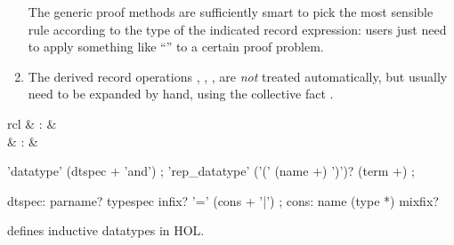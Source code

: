 \begin{isabellebody}
\begin{isamarkuptext}
\begin{enumerate}
  The generic proof methods are sufficiently smart to pick the most
  sensible rule according to the type of the indicated record
  expression: users just need to apply something like ``'' to a certain proof problem.

  \item The derived record operations , , ,  are \emph{not}
  treated automatically, but usually need to be expanded by hand,
  using the collective fact .

  \end{enumerate}%
\end{isamarkuptext}%
\isamarkuptrue%
%
\isamarkuptrue%
%
\begin{isamarkuptext}%
\begin{matharray}{rcl}
    \hypertarget{command.HOL.datatype}{\hyperlink{command.HOL.datatype}{\mbox{}}} & : &  \\
  \hypertarget{command.HOL.rep-datatype}{\hyperlink{command.HOL.rep-datatype}{\mbox{}}} & : &  \\
  \end{matharray}

  \begin{rail}
    'datatype' (dtspec + 'and')
    ;
    'rep\_datatype' ('(' (name +) ')')? (term +)
    ;

    dtspec: parname? typespec infix? '=' (cons + '|')
    ;
    cons: name (type *) mixfix?
  \end{rail}

  \begin{description}

  \item \hyperlink{command.HOL.datatype}{\mbox{}} defines inductive datatypes in
  HOL.


\end{description}
\end{isamarkuptext}
\end{isabellebody}
